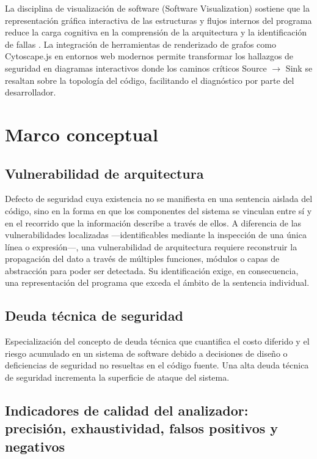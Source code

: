La disciplina de visualización de software (Software Visualization) sostiene que la representación gráfica interactiva de las estructuras y flujos internos del programa reduce la carga cognitiva en la comprensión de la arquitectura y la identificación de fallas \citep{diehl2007}. La integración de herramientas de renderizado de grafos como Cytoscape.js en entornos web modernos permite transformar los hallazgos de seguridad en diagramas interactivos donde los caminos críticos Source $\rightarrow$ Sink se resaltan sobre la topología del código, facilitando el diagnóstico por parte del desarrollador.

\section{Marco conceptual}\label{sec:n3.3}

\subsection{Vulnerabilidad de arquitectura}\label{sec:n3.3.1}

Defecto de seguridad cuya existencia no se manifiesta en una sentencia aislada del código, sino en la forma en que los componentes del sistema se vinculan entre sí y en el recorrido que la información describe a través de ellos. A diferencia de las vulnerabilidades localizadas —identificables mediante la inspección de una única línea o expresión—, una vulnerabilidad de arquitectura requiere reconstruir la propagación del dato a través de múltiples funciones, módulos o capas de abstracción para poder ser detectada. Su identificación exige, en consecuencia, una representación del programa que exceda el ámbito de la sentencia individual.

\subsection{Deuda técnica de seguridad}\label{sec:n3.3.2}

Especialización del concepto de deuda técnica que cuantifica el costo diferido y el riesgo acumulado en un sistema de software debido a decisiones de diseño o deficiencias de seguridad no resueltas en el código fuente. Una alta deuda técnica de seguridad incrementa la superficie de ataque del sistema.

\subsection{Indicadores de calidad del analizador: precisión, exhaustividad, falsos positivos y negativos}\label{sec:n3.3.3}

